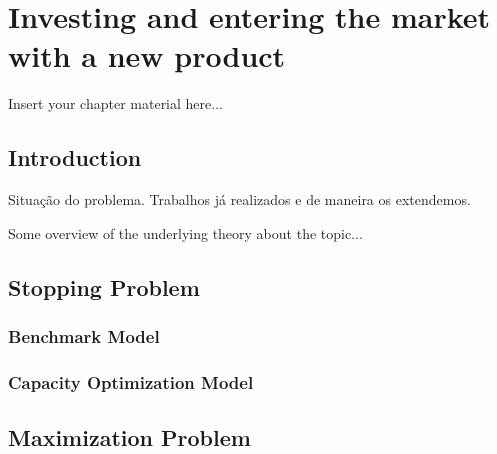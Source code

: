 
\chapter{Investing and entering the market with a new product}
\label{chapter:background}

Insert your chapter material here...


\section{Introduction}
\label{section:overview}

Situação do problema.
Trabalhos já realizados e de maneira os extendemos.

Some overview of the underlying theory about the topic...


\section{Stopping Problem}
\label{section:1_theory}



\subsection{Benchmark Model}
\label{subsec:1_bm}

\subsection{Capacity Optimization Model}
\label{subsec:1_com}



\section{Maximization Problem}
\label{section:1_probmax}


